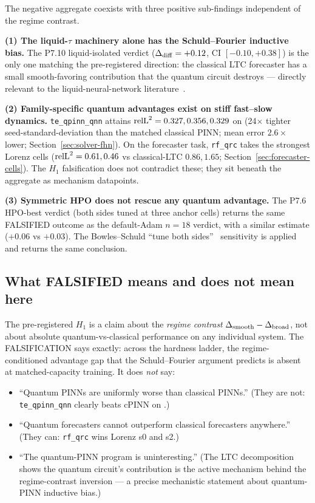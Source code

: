 The negative aggregate coexists with three positive sub-findings
independent of the regime contrast.

\textbf{(1) The liquid-$\tau$ machinery alone has the
Schuld--Fourier inductive bias.} The P7.10 liquid-isolated verdict
($\Delta_{\mathrm{diff}} = +0.12$, CI $[-0.10, +0.38]$) is the only one matching the
pre-registered direction: the classical LTC forecaster has a small
smooth-favoring contribution that the quantum circuit destroys ---
directly relevant to the liquid-neural-network
literature~\cite{hasani2021liquid,hasani2022closed}.

\textbf{(2) Family-specific quantum advantages exist on stiff
fast--slow dynamics.} \texttt{te\_qpinn\_qnn} attains $\mathrm{relL}^2 =
0.327, 0.356, 0.329$ on \fhn{} (24$\times$ tighter
seed-standard-deviation than the matched classical PINN; mean error
$2.6\times$ lower; Section~\ref{sec:solver-fhn}). On the forecaster
task, \texttt{rf\_qrc} takes the strongest Lorenz cells ($\mathrm{relL}^2 =
0.61, 0.46$ vs classical-LTC $0.86, 1.65$;
Section~\ref{sec:forecaster-cells}). The $H_1$ falsification does not
contradict these; they sit beneath the aggregate as mechanism
datapoints.

\textbf{(3) Symmetric HPO does not rescue any quantum advantage.}
The P7.6 HPO-best verdict (both sides tuned at three anchor cells)
returns the same FALSIFIED outcome as the default-Adam $n=18$
verdict, with a similar estimate ($+0.06$ vs $+0.03$). The
Bowles--Schuld ``tune both sides''~\cite{bowles2024better}
sensitivity is applied and returns the same conclusion.

\subsection{What FALSIFIED means and does not mean here}
\label{sec:verdict-meaning}

The pre-registered $H_1$ is a claim about the \emph{regime contrast}
$\Delta_{\mathrm{smooth}} - \Delta_{\mathrm{broad}}$, not about absolute quantum-vs-classical
performance on any individual system. The FALSIFICATION says exactly:
across the hardness ladder, the regime-conditioned advantage gap that
the Schuld--Fourier argument predicts is absent at matched-capacity
training. It does \emph{not} say:

\begin{itemize}
  \item ``Quantum PINNs are uniformly worse than classical
        PINNs.'' (They are not: \texttt{te\_qpinn\_qnn} clearly
        beats cPINN on \fhn{}.)
  \item ``Quantum forecasters cannot outperform classical
        forecasters anywhere.'' (They can: \texttt{rf\_qrc}
        wins Lorenz s0 and s2.)
  \item ``The quantum-PINN program is uninteresting.'' (The LTC
        decomposition shows the quantum circuit's contribution is the
        active mechanism behind the regime-contrast inversion --- a
        precise mechanistic statement about quantum-PINN inductive
        bias.)
\end{itemize}

